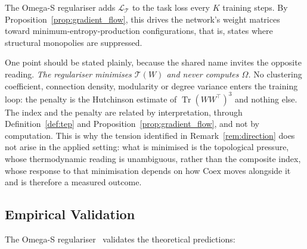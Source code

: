 \documentclass[11pt,a4paper]{article}
\begin{document}
The Omega-S regulariser adds $\mathcal{L}_\mathcal{T}$ to the task loss every
$K$ training steps. By Proposition~\ref{prop:gradient_flow}, this drives the network's weight
matrices toward minimum-entropy-production configurations, that is, states
where structural monopolies are suppressed.

One point should be stated plainly, because the shared name invites the
opposite reading. \emph{The regulariser minimises $\mathcal{T}(W)$ and never
computes $\Omega$.} No clustering coefficient, connection density,
modularity or degree variance enters the training loop: the penalty is the
Hutchinson estimate of $\operatorname{Tr}(WW^\top)^3$ and nothing else. The
index and the penalty are related by interpretation, through
Definition~\ref{def:tep} and Proposition~\ref{prop:gradient_flow}, and not
by computation. This is why the tension identified in Remark~\ref{rem:direction}
does not arise in the applied setting: what is minimised is the topological
pressure, whose thermodynamic reading is unambiguous, rather than the
composite index, whose response to that minimisation depends on how
$\mathrm{Coex}$ moves alongside it and is therefore a measured outcome.

\subsection{Empirical Validation}

The Omega-S regulariser~\cite{acedo2026omegas} validates the theoretical
predictions:
\end{document}

